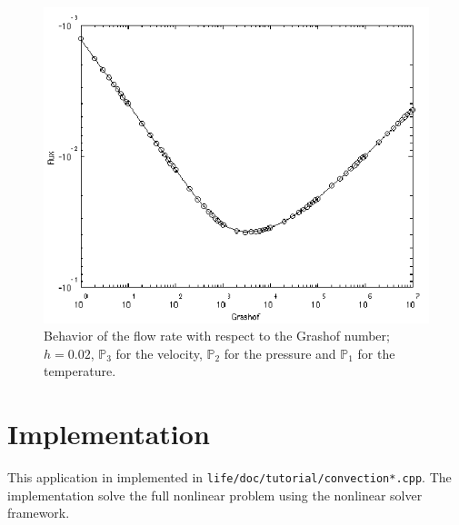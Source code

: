 \begin{figure}[htbp]
  \centering
  \includegraphics[width=.8\linewidth]{pngs/debit_grashof}
  \caption{Behavior of the flow rate with respect to the Grashof number; $h = 0.02$,
    $\mathbb{P}_3$ for the velocity, $\mathbb{P}_2$ for the pressure and
    $\mathbb{P}_1$ for the temperature.}
  \label{fig:4}
\end{figure}

\section{Implementation}
\label{sec:implementation}

This application in implemented in
\texttt{life/doc/tutorial/convection*.cpp}. The implementation solve
the full nonlinear problem using the nonlinear solver framework.


